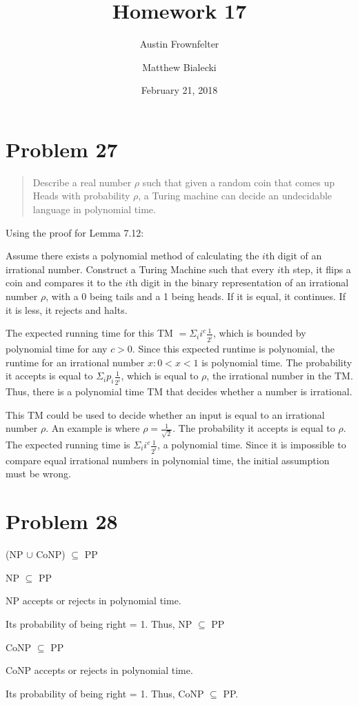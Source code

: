 \documentclass{article}
\title{Homework 17}
\author{Austin Frownfelter \and Matthew Bialecki}
\date{February 21, 2018}
\begin{document}
\maketitle

\section{Problem 27}
\begin{quote}
Describe a real number $\rho$ such that given a random coin that comes up Heads with probability $\rho$, a Turing machine can decide an undecidable language in polynomial time.
\end{quote}

Using the proof for Lemma 7.12: 

Assume there exists a polynomial method of calculating the $i$th digit of an irrational number.  Construct a Turing Machine such that every $i$th step, it flips a coin and compares it to the $i$th digit in the binary representation of an  irrational number $\rho$, with a 0 being tails and a 1 being heads.  If it is equal, it continues.  If it is less, it rejects and halts.  

The expected running time for this TM $= \Sigma_i i^c \frac1{2^i}$, which is bounded by polynomial time for any $c>0$.  Since this expected runtime is polynomial, the runtime for an irrational number $x: 0<x<1$ is polynomial time.  The probability it accepts is equal to $\Sigma_i p_i\frac1{2^i}$, which is equal to $\rho$, the irrational number in the TM.  Thus, there is a polynomial time TM that decides whether a number is irrational.

This TM could be used to decide whether an input is equal to an irrational number $\rho$.  An example is where $\rho=\frac1{\sqrt2}$.  The probability it accepts is equal to $\rho$.  The expected running time is $\Sigma_i i^c \frac1{2^i}$, a polynomial time.  Since it is impossible to compare equal irrational numbers in polynomial time, the initial assumption must be wrong.

\section{Problem 28}

(NP $\cup$ CoNP) $\subseteq$ PP

\bigskip
NP $\subseteq$ PP

NP accepts or rejects in polynomial time.  

Its probability of being right = 1.  Thus, NP $\subseteq$ PP

\bigskip
CoNP $\subseteq$ PP

CoNP accepts or rejects in polynomial time.  

Its probability of being right = 1.  Thus, CoNP $\subseteq$ PP.  
\end{document}
